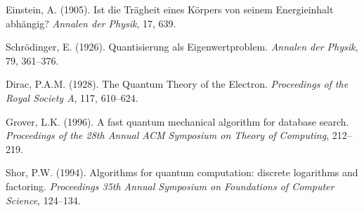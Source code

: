 \documentclass[12pt,a4paper]{article}
\begin{document}
\begin{thebibliography}{99}
		Einstein, A. (1905). Ist die Trägheit eines Körpers von seinem Energieinhalt abhängig? \textit{Annalen der Physik}, 17, 639.
		
		Schrödinger, E. (1926). Quantisierung als Eigenwertproblem. \textit{Annalen der Physik}, 79, 361--376.
		
		Dirac, P.A.M. (1928). The Quantum Theory of the Electron. \textit{Proceedings of the Royal Society A}, 117, 610--624.
		
		Grover, L.K. (1996). A fast quantum mechanical algorithm for database search. \textit{Proceedings of the 28th Annual ACM Symposium on Theory of Computing}, 212--219.
		
		Shor, P.W. (1994). Algorithms for quantum computation: discrete logarithms and factoring. \textit{Proceedings 35th Annual Symposium on Foundations of Computer Science}, 124--134.
	\end{thebibliography}
	
\end{document}
